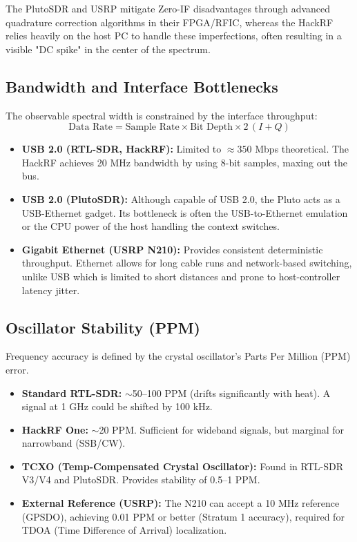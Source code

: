 \documentclass[11pt]{article}
\begin{document}
The PlutoSDR and USRP mitigate Zero-IF disadvantages through advanced quadrature correction algorithms in their FPGA/RFIC, whereas the HackRF relies heavily on the host PC to handle these imperfections, often resulting in a visible "DC spike" in the center of the spectrum.

\subsection{Bandwidth and Interface Bottlenecks}
The observable spectral width is constrained by the interface throughput:
\begin{equation}
    \text{Data Rate} = \text{Sample Rate} \times \text{Bit Depth} \times 2 \, (I+Q)
\end{equation}

\begin{itemize}
    \item \textbf{USB 2.0 (RTL-SDR, HackRF):} Limited to $\approx 350$ Mbps theoretical. The HackRF achieves 20 MHz bandwidth by using 8-bit samples, maxing out the bus.
    \item \textbf{USB 2.0 (PlutoSDR):} Although capable of USB 2.0, the Pluto acts as a USB-Ethernet gadget. Its bottleneck is often the USB-to-Ethernet emulation or the CPU power of the host handling the context switches.
    \item \textbf{Gigabit Ethernet (USRP N210):} Provides consistent deterministic throughput. Ethernet allows for long cable runs and network-based switching, unlike USB which is limited to short distances and prone to host-controller latency jitter.
\end{itemize}

\subsection{Oscillator Stability (PPM)}
Frequency accuracy is defined by the crystal oscillator's Parts Per Million (PPM) error.

\begin{itemize}
    \item \textbf{Standard RTL-SDR:} $\sim$50--100 PPM (drifts significantly with heat). A signal at 1 GHz could be shifted by 100 kHz.
    \item \textbf{HackRF One:} $\sim$20 PPM. Sufficient for wideband signals, but marginal for narrowband (SSB/CW).
    \item \textbf{TCXO (Temp-Compensated Crystal Oscillator):} Found in RTL-SDR V3/V4 and PlutoSDR. Provides stability of 0.5--1 PPM.
    \item \textbf{External Reference (USRP):} The N210 can accept a 10 MHz reference (GPSDO), achieving 0.01 PPM or better (Stratum 1 accuracy), required for TDOA (Time Difference of Arrival) localization.
\end{itemize}
\end{document}
